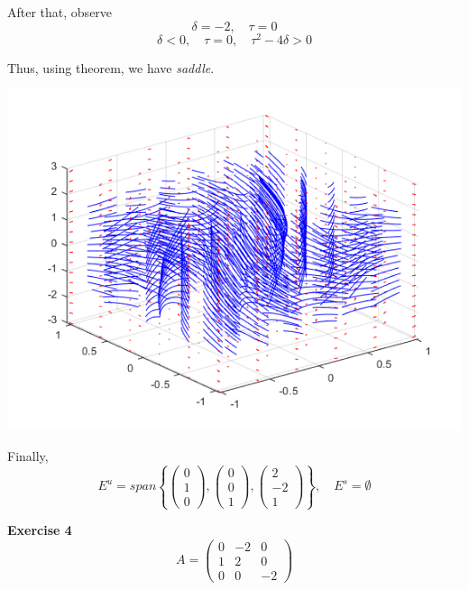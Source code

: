 \documentclass[12pt]{article}
\begin{document}
    After that, observe
    $$
        \delta = -2,\quad\tau = 0
    $$
    $$
        \delta < 0,\quad\tau = 0,\quad
        \tau^2-4\delta>0
    $$

    Thus, using theorem, we have \textit{saddle}.

    \begin{center}
        \includegraphics[scale=0.8]{plot3.png}
    \end{center}

    Finally,
    $$
        E^u = span
        \left\{ 
            \begin{pmatrix}
                0\\
                1\\
                0
            \end{pmatrix},
            \begin{pmatrix}
                0\\
                0\\
                1
            \end{pmatrix},
            \begin{pmatrix}
                2\\
                -2\\
                1
            \end{pmatrix}
        \right\},
        \quad
        E^s=\emptyset
    $$


    \textbf{Exercise 4}
    $$
        A =
        \begin{pmatrix}
            0 & -2 & 0\\
            1 & 2 & 0\\
            0 & 0 & -2
        \end{pmatrix}
    $$
\end{document}
